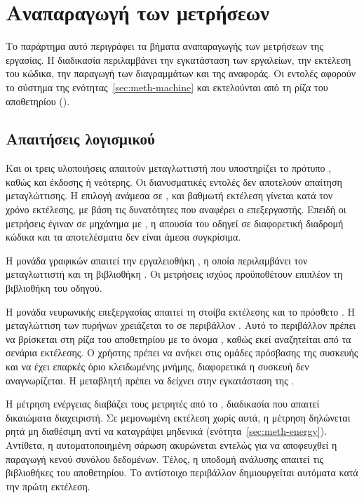 \chapter{Αναπαραγωγή των μετρήσεων}
\label{app:reproducibility}

Το παράρτημα αυτό περιγράφει τα βήματα αναπαραγωγής των μετρήσεων της εργασίας.
Η διαδικασία περιλαμβάνει την εγκατάσταση των εργαλείων, την εκτέλεση του
κώδικα, την παραγωγή των διαγραμμάτων και της αναφοράς. Οι εντολές αφορούν το
σύστημα της ενότητας~\ref{sec:meth-machine} και εκτελούνται από τη ρίζα του
αποθετηρίου ().

\section{Απαιτήσεις λογισμικού}
\label{sec:repro-requirements}

Και οι τρεις υλοποιήσεις απαιτούν μεταγλωττιστή  που υποστηρίζει το
πρότυπο , καθώς και  έκδοσης  ή νεότερης. Οι
διανυσματικές εντολές δεν αποτελούν απαίτηση μεταγλώττισης. Η επιλογή ανάμεσα
σε ,  και βαθμωτή εκτέλεση γίνεται κατά τον χρόνο
εκτέλεσης, με βάση τις δυνατότητες που αναφέρει ο επεξεργαστής. Επειδή οι
μετρήσεις έγιναν σε μηχάνημα με , η απουσία του οδηγεί σε
διαφορετική διαδρομή κώδικα και τα αποτελέσματα δεν είναι άμεσα συγκρίσιμα.

Η μονάδα γραφικών απαιτεί την εργαλειοθήκη , η οποία περιλαμβάνει τον
μεταγλωττιστή  και τη βιβλιοθήκη . Οι μετρήσεις ισχύος
προϋποθέτουν επιπλέον τη βιβλιοθήκη  του οδηγού.

Η μονάδα νευρωνικής επεξεργασίας απαιτεί τη στοίβα εκτέλεσης  και το
πρόσθετο . Η μεταγλώττιση των πυρήνων χρειάζεται το  σε
περιβάλλον . Αυτό το περιβάλλον πρέπει να βρίσκεται στη ρίζα του
αποθετηρίου με το όνομα , καθώς εκεί αναζητείται από τα σενάρια
εκτέλεσης. Ο χρήστης πρέπει να ανήκει στις ομάδες πρόσβασης της συσκευής και να
έχει επαρκές όριο κλειδωμένης μνήμης, διαφορετικά η συσκευή δεν αναγνωρίζεται.
Η μεταβλητή  πρέπει να δείχνει στην εγκατάσταση της .

Η μέτρηση ενέργειας διαβάζει τους μετρητές  από το
, διαδικασία που απαιτεί δικαιώματα διαχειριστή. Σε
μεμονωμένη εκτέλεση χωρίς αυτά, η μέτρηση δηλώνεται ρητά μη διαθέσιμη αντί να
καταγράψει μηδενικά (ενότητα~\ref{sec:meth-energy}). Αντίθετα, η
αυτοματοποιημένη σάρωση ακυρώνεται εντελώς για να αποφευχθεί η παραγωγή κενού
συνόλου δεδομένων. Τέλος, η υποδομή ανάλυσης απαιτεί τις βιβλιοθήκες
 του αποθετηρίου. Το αντίστοιχο περιβάλλον δημιουργείται αυτόματα
κατά την πρώτη εκτέλεση.

